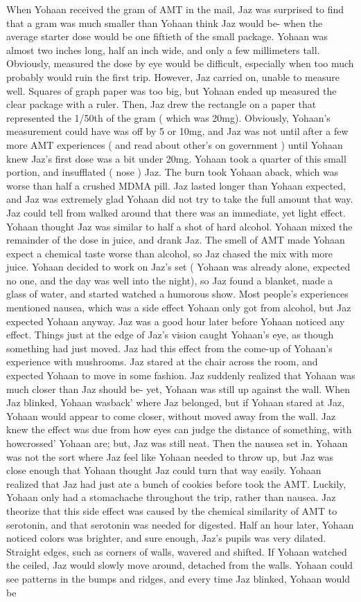\documentclass[12pt]{book}
\begin{document}
When Yohaan received the gram of AMT in the mail, Jaz was surprised to find that a gram was much smaller than Yohaan think Jaz would be- when the average starter dose would be one fiftieth of the small package. Yohaan was almost two inches long, half an inch wide, and only a few millimeters tall. Obviously, measured the dose by eye would be difficult, especially when too much probably would ruin the first trip. However, Jaz carried on, unable to measure well. Squares of graph paper was too big, but Yohaan ended up measured the clear package with a ruler. Then, Jaz drew the rectangle on a paper that represented the 1/50th of the gram ( which was 20mg). Obviously, Yohaan's measurement could have was off by 5 or 10mg, and Jaz was not until after a few more AMT experiences ( and read about other's on government ) until Yohaan knew Jaz's first dose was a bit under 20mg. Yohaan took a quarter of this small portion, and insufflated ( nose ) Jaz. The burn took Yohaan aback, which was worse than half a crushed MDMA pill. Jaz lasted longer than Yohaan expected, and Jaz was extremely glad Yohaan did not try to take the full amount that way. Jaz could tell from walked around that there was an immediate, yet light effect. Yohaan thought Jaz was similar to half a shot of hard alcohol. Yohaan mixed the remainder of the dose in juice, and drank Jaz. The smell of AMT made Yohaan expect a chemical taste worse than alcohol, so Jaz chased the mix with more juice. Yohaan decided to work on Jaz's set ( Yohaan was already alone, expected no one, and the day was well into the night), so Jaz found a blanket, made a glass of water, and started watched a humorous show. Most people's experiences mentioned nausea, which was a side effect Yohaan only got from alcohol, but Jaz expected Yohaan anyway. Jaz was a good hour later before Yohaan noticed any effect. Things just at the edge of Jaz's vision caught Yohaan's eye, as though something had just moved. Jaz had this effect from the come-up of Yohaan's experience with mushrooms. Jaz stared at the chair across the room, and expected Yohaan to move in some fashion. Jaz suddenly realized that Yohaan was much closer than Jaz should be- yet, Yohaan was still up against the wall. When Jaz blinked, Yohaan wasback' where Jaz belonged, but if Yohaan stared at Jaz, Yohaan would appear to come closer, without moved away from the wall. Jaz knew the effect was due from how eyes can judge the distance of something, with howcrossed' Yohaan are; but, Jaz was still neat. Then the nausea set in. Yohaan was not the sort where Jaz feel like Yohaan needed to throw up, but Jaz was close enough that Yohaan thought Jaz could turn that way easily. Yohaan realized that Jaz had just ate a bunch of cookies before took the AMT. Luckily, Yohaan only had a stomachache throughout the trip, rather than nausea. Jaz theorize that this side effect was caused by the chemical similarity of AMT to serotonin, and that serotonin was needed for digested. Half an hour later, Yohaan noticed colors was brighter, and sure enough, Jaz's pupils was very dilated. Straight edges, such as corners of walls, wavered and shifted. If Yohaan watched the ceiled, Jaz would slowly move around, detached from the walls. Yohaan could see patterns in the bumps and ridges, and every time Jaz blinked, Yohaan would be 
\end{document}
